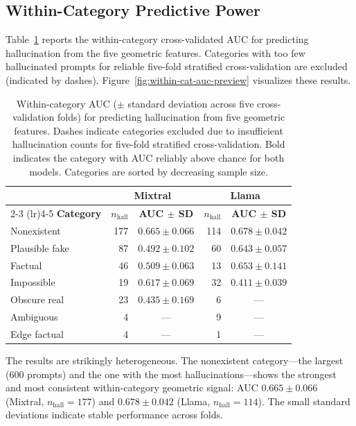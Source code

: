 \subsection{Within-Category Predictive Power}
\label{sec:within-cat-auc}

Table~\ref{tab:within-category-auc} reports the within-category cross-validated AUC for predicting hallucination from the five geometric features. Categories with too few hallucinated prompts for reliable five-fold stratified cross-validation are excluded (indicated by dashes). Figure~\ref{fig:within-cat-auc-preview} visualizes these results.

\begin{table}[ht]
\centering
\small
\begin{tabular}{lrcrc}
\toprule
& \multicolumn{2}{c}{\textbf{Mixtral}} & \multicolumn{2}{c}{\textbf{Llama}} \\
\cmidrule(lr){2-3} \cmidrule(lr){4-5}
\textbf{Category} & $n_{\text{hall}}$ & \textbf{AUC $\pm$ SD} & $n_{\text{hall}}$ & \textbf{AUC $\pm$ SD} \\
\midrule
Nonexistent         & 177 & $\mathbf{0.665 \pm 0.066}$ & 114 & $\mathbf{0.678 \pm 0.042}$ \\
Plausible fake      &  87 & $0.492 \pm 0.102$          &  60 & $0.643 \pm 0.057$ \\
Factual             &  46 & $0.509 \pm 0.063$          &  13 & $0.653 \pm 0.141$ \\
Impossible          &  19 & $0.617 \pm 0.069$          &  32 & $0.411 \pm 0.039$ \\
Obscure real        &  23 & $0.435 \pm 0.169$          &   6 & --- \\
Ambiguous           &   4 & ---                        &   9 & --- \\
Edge factual        &   4 & ---                        &   1 & --- \\
\bottomrule
\end{tabular}
\caption{Within-category AUC ($\pm$ standard deviation across five cross-validation folds) for predicting hallucination from five geometric features. Dashes indicate categories excluded due to insufficient hallucination counts for five-fold stratified cross-validation. Bold indicates the category with AUC reliably above chance for both models. Categories are sorted by decreasing sample size.}
\label{tab:within-category-auc}
\end{table}

The results are strikingly heterogeneous. The nonexistent category---the largest (600 prompts) and the one with the most hallucinations---shows the strongest and most consistent within-category geometric signal: AUC $0.665 \pm 0.066$ (Mixtral, $n_{\text{hall}} = 177$) and $0.678 \pm 0.042$ (Llama, $n_{\text{hall}} = 114$). The small standard deviations indicate stable performance across folds.

